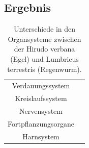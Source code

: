 \documentclass[oneside,10pt,a4paper]{report}
\begin{document}
			\subsection{Ergebnis}
				\begin{table}[H]
					\centering
					\caption{Unterschiede in den Organsysteme zwischen der Hirudo verbana (Egel) und Lumbricus terrestris (Regenwurm).}
					\label{tab: Egel vs Regenwurm}
					\begin{tabular}{cc}
						\toprule
						\multirow{2}{*}{Verdauungssystem} & \\
						&\\
						\midrule
						\multirow{2}{*}{Kreislaufssystem}& \\	
						&\\
						\midrule
						\multirow{2}{*}{Nervensystem} & \\
						&\\
						\midrule
						\multirow{2}{*}{Fortpflanzungsorgane} & \\
						&\\
						\midrule
						\multirow{2}{*}{Harnsystem} & \\
						&\\			
						\bottomrule
					\end{tabular}
				\end{table}
			
\end{document}
